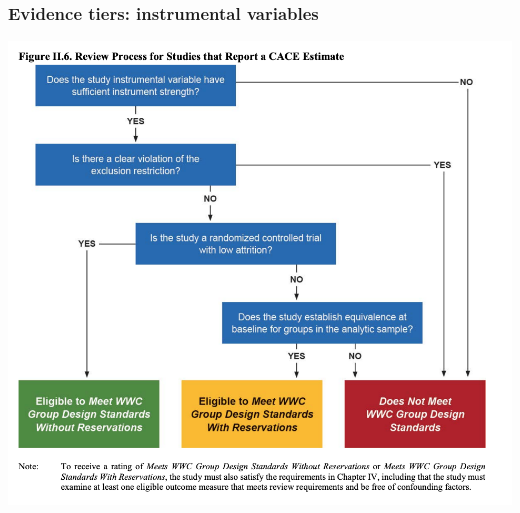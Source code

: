 \documentclass[usenames,dvipsnames]{beamer}
\begin{document}

\begin{frame}[label= doe_iv]
\frametitle{Evidence tiers: instrumental variables}

\begin{center}
\vspace{-0.35cm}
\includegraphics[scale=0.62]{../figs/DoE_CACE_IV.png} 
\end{center}

\end{frame}

\end{document}
